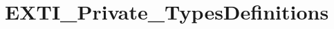 \hypertarget{group___e_x_t_i___private___types_definitions}{}\section{E\+X\+T\+I\+\_\+\+Private\+\_\+\+Types\+Definitions}
\label{group___e_x_t_i___private___types_definitions}
